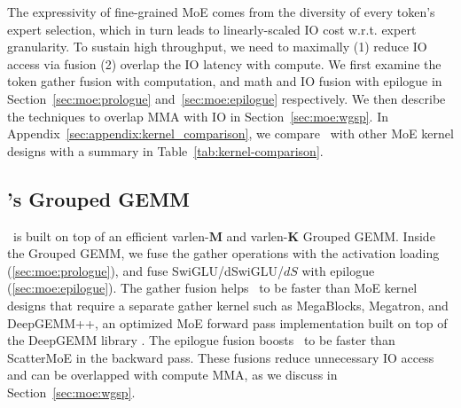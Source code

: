 



The expressivity of fine-grained MoE comes from the diversity of every token's expert selection, which in turn leads to linearly-scaled IO cost w.r.t. expert granularity. To sustain high throughput, we need to maximally (1) reduce IO access via fusion (2) overlap the IO latency with compute. We first examine the token gather fusion with computation, and math and IO fusion with epilogue in Section~\ref{sec:moe:prologue} and~\ref{sec:moe:epilogue} respectively. We then describe the techniques to overlap MMA with IO in Section~\ref{sec:moe:wgsp}. In Appendix~\ref{sec:appendix:kernel_comparison}, we compare \Algname~with other MoE kernel designs with a summary in Table~\ref{tab:kernel-comparison}.







\subsection{\Algname's Grouped GEMM}

\Algname~is built on top of an efficient varlen-$\mathbf{M}$ and varlen-$\mathbf{K}$ Grouped GEMM. Inside the Grouped GEMM, we fuse the gather operations with the activation loading (\ref{sec:moe:prologue}), and fuse SwiGLU/dSwiGLU/$dS$ with epilogue (\ref{sec:moe:epilogue}). The gather fusion helps \Algname~to be faster than MoE kernel designs that require a separate gather kernel such as MegaBlocks, Megatron, and DeepGEMM++, an optimized MoE forward pass implementation built on top of the DeepGEMM library \citep{deepgemm}. The epilogue fusion boosts \Algname~to be faster than ScatterMoE in the backward pass. These fusions reduce unnecessary IO access and can be overlapped with compute MMA, as we discuss in Section~\ref{sec:moe:wgsp}.

